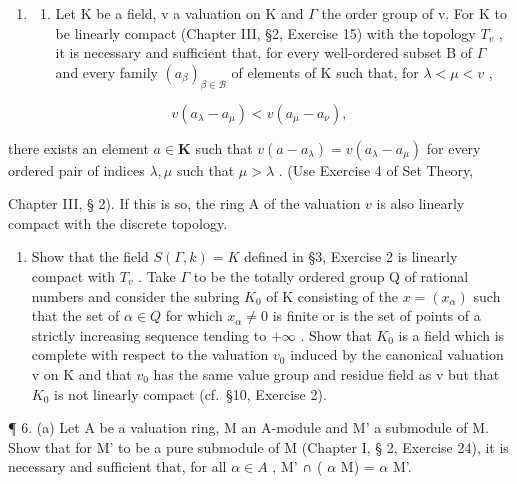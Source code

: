 \begin{enumerate}
\def\labelenumi{\arabic{enumi}.}
\setcounter{enumi}{4}
\tightlist
\item
  \begin{enumerate}
  \def\labelenumii{(\alph{enumii})}
  \tightlist
  \item
    Let K be a field, v a valuation on K and \(\Gamma\) the order group of v. For K to be linearly compact (Chapter III, §2, Exercise 15) with the topology \(T_{v}\) , it is necessary and sufficient that, for every well-ordered subset B of \(\Gamma\) and every family \((a_{\beta})_{\beta\in\mathcal{B}}\) of elements of K such that, for \(\lambda<\mu<v\) ,
  \end{enumerate}
\end{enumerate}

\[
v (a _ {\lambda} - a _ {\mu}) <   v (a _ {\mu} - a _ {\nu}),
\]

there exists an element \(a \in \mathbf{K}\) such that \(v(a - a_{\lambda}) = v(a_{\lambda} - a_{\mu})\) for every ordered pair of indices \(\lambda, \mu\) such that \(\mu > \lambda\) . (Use Exercise 4 of Set Theory,

Chapter III, § 2). If this is so, the ring A of the valuation \(v\) is also linearly compact with the discrete topology.

\begin{enumerate}
\def\labelenumi{(\alph{enumi})}
\setcounter{enumi}{1}
\tightlist
\item
  Show that the field \(S(\Gamma, k) = K\) defined in §3, Exercise 2 is linearly compact with \(T_{v}\) . Take \(\Gamma\) to be the totally ordered group Q of rational numbers and consider the subring \(K_{0}\) of K consisting of the \(x = (x_{\alpha})\) such that the set of \(\alpha \in Q\) for which \(x_{\alpha} \neq 0\) is finite or is the set of points of a strictly increasing sequence tending to \(+\infty\) . Show that \(K_{0}\) is a field which is complete with respect to the valuation \(v_{0}\) induced by the canonical valuation v on K and that \(v_{0}\) has the same value group and residue field as v but that \(K_{0}\) is not linearly compact (cf.~§10, Exercise 2).
\end{enumerate}

¶ 6. (a) Let A be a valuation ring, M an A-module and M' a submodule of M. Show that for M' to be a pure submodule of M (Chapter I, § 2, Exercise 24), it is necessary and sufficient that, for all \(\alpha \in A\) , M' ∩ ( \(\alpha\) M) = \(\alpha\) M'.

